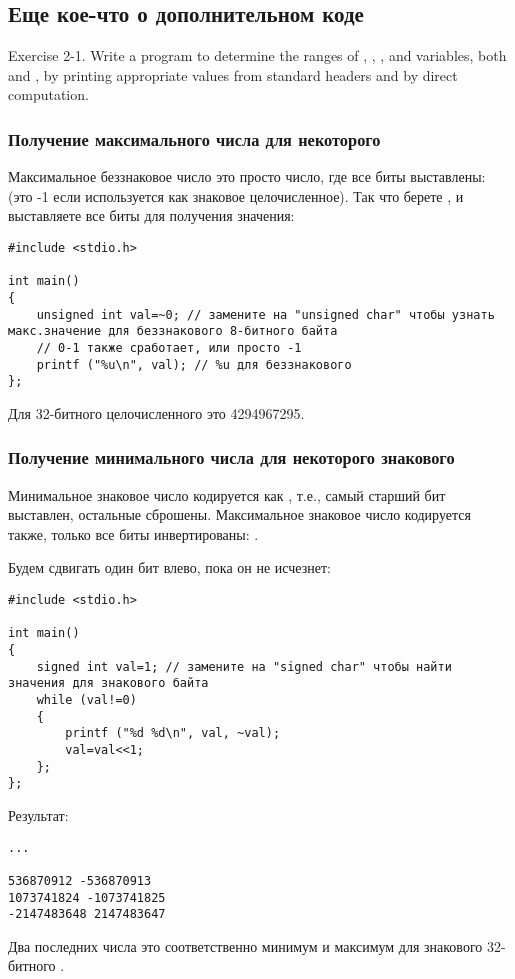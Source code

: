 \subsection{Еще кое-что о дополнительном коде}

\epigraph{Exercise 2-1. Write a program to determine the ranges of , , , and 
variables, both  and , by printing appropriate values from standard headers
and by direct computation.}{\KRBook}

\subsubsection{Получение максимального числа для некоторого }

Максимальное беззнаковое число это просто число, где все биты выставлены: 
(это -1 если  используется как знаковое целочисленное).
Так что берете , и выставляете все биты для получения значения:

\begin{lstlisting}[style=customc]
#include <stdio.h>

int main()
{
	unsigned int val=~0; // замените на "unsigned char" чтобы узнать макс.значение для беззнакового 8-битного байта
	// 0-1 также сработает, или просто -1
	printf ("%u\n", val); // %u для беззнакового
};
\end{lstlisting}

Для 32-битного целочисленного это 4294967295.

\subsubsection{Получение минимального числа для некоторого знакового }

Минимальное знаковое число кодируется как , т.е., самый старший бит выставлен, остальные сброшены.
Максимальное знаковое число кодируется также, только все биты инвертированы: .

Будем сдвигать один бит влево, пока он не исчезнет:

\begin{lstlisting}[style=customc]
#include <stdio.h>

int main()
{
	signed int val=1; // замените на "signed char" чтобы найти значения для знакового байта
	while (val!=0)
	{
		printf ("%d %d\n", val, ~val);
		val=val<<1;
	};
};
\end{lstlisting}

Результат:

\begin{lstlisting}
...

536870912 -536870913
1073741824 -1073741825
-2147483648 2147483647
\end{lstlisting}

Два последних числа это соответственно минимум и максимум для знакового 32-битного .

